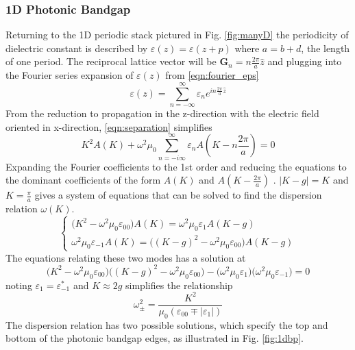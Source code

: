 \subsubsection{1D Photonic Bandgap}
Returning to the 1D periodic stack pictured in Fig. \ref{fig:manyD} the periodicity of dielectric constant is described by $\varepsilon(z) = \varepsilon(z+p)$ where $a = b+d$, the length of one period. The reciprocal lattice vector will be $\boldsymbol{G}_n = n\frac{2\pi}{a}\hat{z}$ and plugging into the Fourier series expansion of $\varepsilon(z)$  from \eqref{eqn:fourier_eps}
\begin{equation}
	\varepsilon(z)  =\sum_{n=-\infty}^\infty\varepsilon_ne^{in\frac{2\pi}{a}\hat{z}}
\end{equation}
From the reduction to propagation in the z-direction with the electric field oriented in x-direction, \eqref{eqn:separation} simplifies
\begin{equation}
	K^2A(K) + \omega^2\mu_0\sum_{n=-i\infty}^\infty\varepsilon_nA(K-n\frac{2\pi}{a}) = 0
\end{equation}
Expanding the Fourier coefficients to the 1st order and reducing the equations to the dominant coefficients of the form $A(K)$ and $A(K-\frac{2\pi}{a})$ . $|K - g| = K$ and $K = \frac{\pi}{a}$ gives a system of equations that can be solved to find the dispersion relation $\omega(K)$.
\begin{equation}
	\begin{cases}
		\big(K^2-\omega^2\mu_0\varepsilon_{00}\big)A(K) = \omega^2\mu_0\varepsilon_1A(K - g) \\
		\omega^2\mu_0\varepsilon_{-1}A(K) = \big((K-g)^2-\omega^2\mu_0\varepsilon_{00}\big)A(K-g)
	\end{cases}
\end{equation}
The equations relating these two modes has a solution at
\begin{equation}
	\big(K^2-\omega^2\mu_0\varepsilon_{00}\big)\big((K-g)^2-\omega^2\mu_0\varepsilon_{00}\big) -\big(\omega^2\mu_0\varepsilon_1\big)\big(\omega^2\mu_0\varepsilon_{-1}\big)  = 0
\end{equation}
noting $\varepsilon_1 = \varepsilon_{-1}^*$ and $K\approx2g$ simplifies the relationship
\begin{equation}
	\omega_{\pm}^2 = \frac{K^2}{\mu_0(\varepsilon_{00}\mp|\varepsilon_1|)}
\end{equation}
The dispersion relation has two possible solutions, which specify the top and bottom of the photonic bandgap edges, as illustrated in Fig. \ref{fig:1dbp}.
